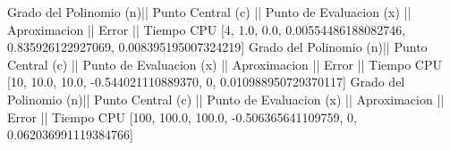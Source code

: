 Grado del Polinomio (n)|| Punto Central (c) || Punto de Evaluacion (x) || Aproximacion || Error || Tiempo CPU 
 [4, 1.0, 0.0, 0.00554486188082746, 0.835926122927069, 0.008395195007324219]
Grado del Polinomio (n)|| Punto Central (c) || Punto de Evaluacion (x) || Aproximacion || Error || Tiempo CPU 
 [10, 10.0, 10.0, -0.544021110889370, 0, 0.010988950729370117]
Grado del Polinomio (n)|| Punto Central (c) || Punto de Evaluacion (x) || Aproximacion || Error || Tiempo CPU 
 [100, 100.0, 100.0, -0.506365641109759, 0, 0.062036991119384766]
